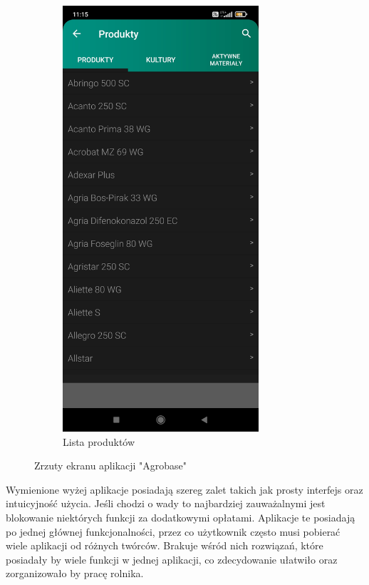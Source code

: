 \documentclass[a4paper,12pt,oneside]{book}
\begin{document}
\begin{figure}[H]
\begin{subfigure}{.5\textwidth}
			\includegraphics[width=0.8\textwidth]{grafika/db_2.jpg}
			\caption{Lista produktów}
		\end{subfigure}
		\caption{Zrzuty ekranu aplikacji "Agrobase"}
	\end{figure}

	Wymienione wyżej aplikacje posiadają szereg zalet takich jak prosty interfejs oraz intuicyjność użycia. Jeśli chodzi o wady to najbardziej zauważalnymi jest blokowanie niektórych funkcji za dodatkowymi opłatami. Aplikacje te posiadają po jednej głównej funkcjonalności, przez co użytkownik często musi pobierać wiele aplikacji od różnych twórców. Brakuje wśród nich rozwiązań, które posiadały by wiele funkcji w jednej aplikacji, co zdecydowanie ułatwiło oraz zorganizowało by pracę rolnika.
	
\end{document}
